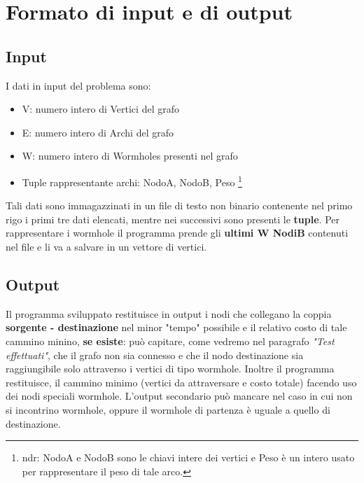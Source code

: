 \def\baselinestretch{1}
\section{Formato di input e di output}
\def\baselinestretch{1.66}
\thispagestyle{headings}

\subsection{Input}
I dati in input del problema sono:
\begin{itemize}
    \item V: numero intero di Vertici del grafo
    \item E: numero intero di Archi del grafo
    \item W: numero intero di Wormholes presenti nel grafo
    \item Tuple rappresentante archi: NodoA, NodoB, Peso
    \footnote{ndr: NodoA e NodoB sono le chiavi intere dei vertici
    e Peso \`e un intero usato per rappresentare il peso di tale
    arco.}
\end{itemize}
Tali dati sono immagazzinati in un file di testo non binario
contenente nel primo rigo i primi tre dati elencati, mentre nei
successivi sono presenti le \textbf{tuple}.
Per rappresentare i wormhole il programma prende gli \textbf{
ultimi W NodiB} contenuti nel file e li va a salvare in un
vettore di vertici.

\subsection{Output}
Il programma sviluppato restituisce in output i nodi che collegano
la coppia \textbf{sorgente - destinazione} nel minor "tempo" possibile 
e il relativo costo di tale cammino minino, \textbf{se esiste}:
pu\`o capitare, come vedremo nel paragrafo \textit{"Test effettuati"},
che il grafo non sia connesso e che il nodo destinazione sia raggiungibile 
solo attraverso i vertici di tipo wormhole.
Inoltre il programma restituisce, il cammino minimo (vertici da attraversare
e costo totale) facendo uso dei nodi speciali wormhole. L'output secondario
pu\`o mancare nel caso in cui non si incontrino wormhole, oppure il wormhole di partenza \`e uguale a quello di destinazione.